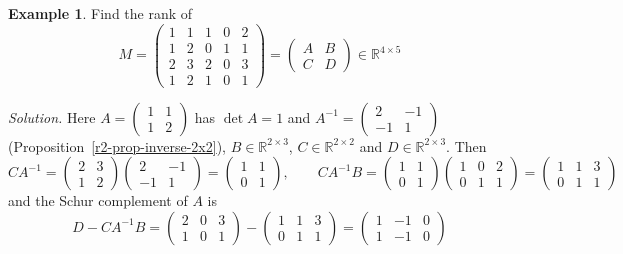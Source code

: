 \documentclass[12pt]{article}
\newcommand{\R}{\mathbb R}
\theoremstyle{definition}
\newtheorem{example}[theorem]{Example}
\begin{document}
\begin{example}\label{r5d-exm-schur-rank}
Find the rank of
\[
M=\left(\begin{array}{cc|ccc}1&1&1&0&2\\1&2&0&1&1\\\hline2&3&2&0&3\\1&2&1&0&1\end{array}\right)
=\begin{pmatrix}A&B\\C&D\end{pmatrix}\in\R^{4\times5}
\]

\textit{Solution.} Here \(A=\left(\begin{smallmatrix}1&1\\1&2\end{smallmatrix}\right)\) has
\(\det A=1\) and \(A^{-1}=\left(\begin{smallmatrix}2&-1\\-1&1\end{smallmatrix}\right)\)
(Proposition~\ref{r2-prop-inverse-2x2}), \(B\in\R^{2\times3}\), \(C\in\R^{2\times2}\) and
\(D\in\R^{2\times3}\). Then
\[
CA^{-1}=\begin{pmatrix}2&3\\1&2\end{pmatrix}\begin{pmatrix}2&-1\\-1&1\end{pmatrix}=\begin{pmatrix}1&1\\0&1\end{pmatrix},\qquad
CA^{-1}B=\begin{pmatrix}1&1\\0&1\end{pmatrix}\begin{pmatrix}1&0&2\\0&1&1\end{pmatrix}=\begin{pmatrix}1&1&3\\0&1&1\end{pmatrix}
\]
and the Schur complement of \(A\) is
\[
D-CA^{-1}B=\begin{pmatrix}2&0&3\\1&0&1\end{pmatrix}-\begin{pmatrix}1&1&3\\0&1&1\end{pmatrix}
=\begin{pmatrix}1&-1&0\\1&-1&0\end{pmatrix}
\]
\end{example}
\end{document}

